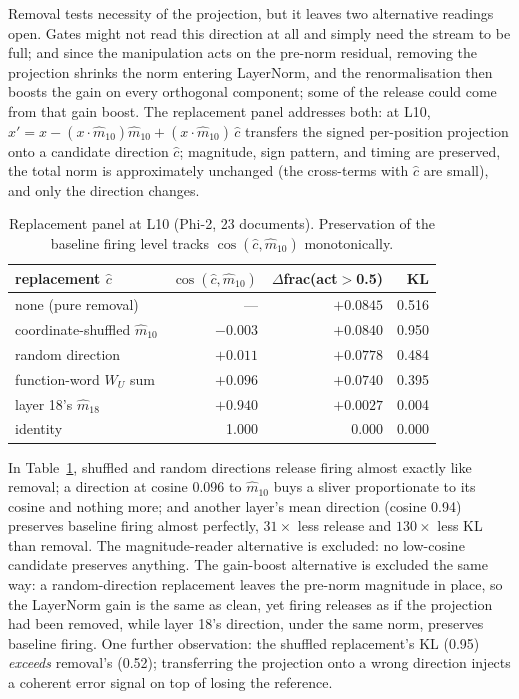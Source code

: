 \documentclass[11pt]{article}
\newcommand{\mhat}{\hat{m}}
\begin{document}
Removal tests necessity of the projection, but it leaves two
alternative readings open. Gates might not read this direction at all
and simply need the stream to be full; and since the manipulation acts
on the pre-norm residual, removing the projection shrinks the norm
entering LayerNorm, and the renormalisation then boosts the gain on every
orthogonal component; some of the release could come from that gain
boost. The replacement panel
addresses both: at L10,
$x' = x - (x\cdot\mhat_{10})\mhat_{10} + (x\cdot\mhat_{10})\,\hat{c}$ transfers the
signed per-position projection onto a candidate direction $\hat{c}$;
magnitude, sign pattern, and timing are preserved, the total norm is
approximately unchanged (the cross-terms with $\hat{c}$ are small),
and only the direction changes.

\begin{table}[t]
\centering
\small
\begin{tabular}{lrrr}
\toprule
replacement $\hat{c}$ & $\cos(\hat{c},\mhat_{10})$ &
$\Delta$frac(act$>$0.5) & KL \\
\midrule
none (pure removal) & --- & $+0.0845$ & 0.516 \\
coordinate-shuffled $\mhat_{10}$ & $-0.003$ & $+0.0840$ & 0.950 \\
random direction & $+0.011$ & $+0.0778$ & 0.484 \\
function-word $W_U$ sum & $+0.096$ & $+0.0740$ & 0.395 \\
layer 18's $\mhat_{18}$ & $+0.940$ & $+0.0027$ & 0.004 \\
identity & 1.000 & 0.000 & 0.000 \\
\bottomrule
\end{tabular}
\caption{Replacement panel at L10 (Phi-2, 23 documents). Preservation
of the baseline firing level tracks $\cos(\hat{c},\mhat_{10})$ monotonically.}
\label{tab:identity}
\end{table}

In Table~\ref{tab:identity}, shuffled and random directions release
firing almost exactly like removal; a direction at cosine 0.096 to $\mhat_{10}$
buys a sliver proportionate to its cosine and nothing more; and
another layer's mean direction (cosine 0.94) preserves baseline firing almost perfectly, $31\times$ less release and $130\times$ less KL than
removal. The magnitude-reader alternative is excluded: no
low-cosine candidate preserves anything. The gain-boost alternative is
excluded the same way: a random-direction replacement leaves the
pre-norm magnitude in place, so the LayerNorm gain is the same as
clean, yet firing releases as if the projection had been removed,
while layer 18's direction, under the same norm, preserves baseline firing. One further observation: the
shuffled replacement's KL (0.95) \emph{exceeds} removal's (0.52);
transferring the projection onto a wrong direction injects a coherent
error signal on top of losing the reference.
\end{document}
